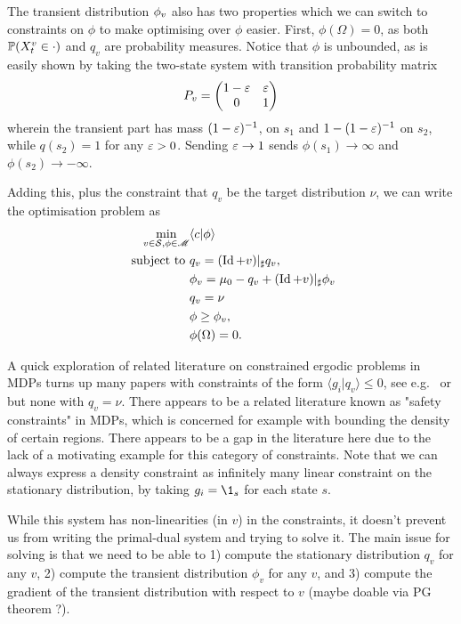 \documentclass[twoside,10pt]{../jmlr}
\begin{document}
The transient distribution $\phi_v$ also has two properties which we can switch to constraints on $\phi$ to make optimising over $\phi$ easier. First, $\phi(\Omega)=0$, as both $\mathbb{P}(X_t^v\in\cdot)$ and $q_v$ are probability measures. Notice that $\phi$ is unbounded, as is easily shown by taking the two-state system with transition probability matrix
\begin{align}
    P_v=\begin{pmatrix} 1-\varepsilon & \varepsilon\\ 0 & 1\end{pmatrix}
\end{align}
wherein the transient part has mass $(1-\varepsilon)^{-1}$, on $s_1$ and $1-(1-\varepsilon)^{-1}$ on $s_2$, while $q(s_2)=1$ for any $\varepsilon>0$. Sending $\varepsilon\to 1$ sends $\phi(s_1)\to\infty$ and $\phi(s_2)\to -\infty$.

Adding this, plus the constraint that $q_v$ be the target distribution $\nu$, we can write the optimisation problem as
\begin{align}
    \min_{v\in\mathcal{S},\phi\in\mathscr{M}}& \langle c\vert\phi\rangle\\ \mbox{ subject to }& q_v=(\operatorname{Id}+v)\vert_\sharp q_v,\\ & \phi_v=\mu_0-q_v+ (\operatorname{Id}+ v)\vert_\sharp \phi_v\\ & q_v=\nu \\& \phi\ge \phi_v,\\ & \phi(\Omega)=0.
\end{align}

A quick exploration of related literature on constrained ergodic problems in MDPs turns up many papers with constraints of the form $\langle g_i\vert q_v\rangle\le 0$, see e.g.\ \cite{vazquez-abad_lp-based_2014} or \cite[and references therein][]{hernandez-lerma_constrained_2003} but none with $ q_v=\nu$. There appears to be a related literature known as "safety constraints" in MDPs, which is concerned for example with bounding the density of certain regions. There appears to be a gap in the literature here due to the lack of a motivating example for this category of constraints. Note that we can always express a density constraint as infinitely many linear constraint on the stationary distribution, by taking $g_i=\1_{s}$ for each state $s$. 

While this system has non-linearities (in $v$) in the constraints, it doesn't prevent us from writing the primal-dual system and trying to solve it. The main issue for solving is that we need to be able to 1) compute the stationary distribution $q_v$ for any $v$,  2) compute the transient distribution $\phi_v$ for any $v$, and 3) compute the gradient of the transient distribution with respect to $v$ (maybe doable via PG theorem ?). 
\end{document}
